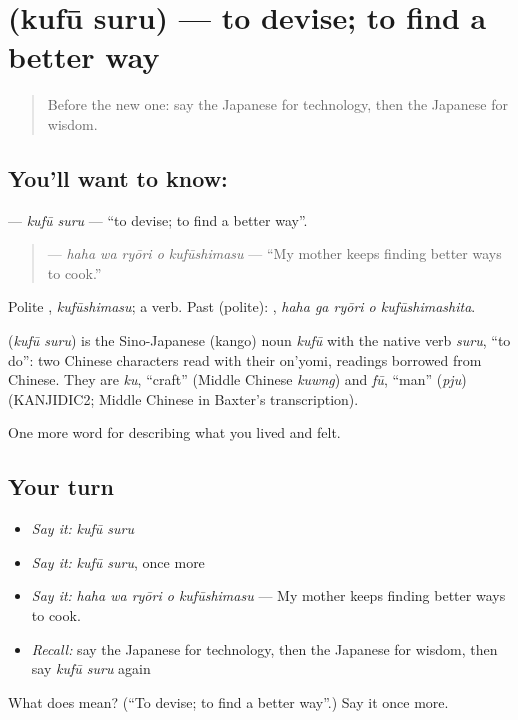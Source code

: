 \section[\texorpdfstring{\ja{くふうする} (kufū suru)}{くふうする (kufū suru)}]{ (kufū suru) — to devise; to find a better way}

\label{lesson:JA-C481-kufuu-suru}



\begin{quote}
Before the new one: say the Japanese for technology, then the Japanese for wisdom.
\end{quote}

\subsection*{You'll want to know: }
\textbf{} — \emph{kufū suru} — \textquotedblleft{}to devise; to find a better way\textquotedblright{}.

\begin{quote}
\textbf{  } — \emph{haha wa ryōri o kufūshimasu} — \textquotedblleft{}My mother keeps finding better ways to cook.\textquotedblright{}
\end{quote}

Polite \textbf{}, \emph{kufūshimasu}; a  verb. Past (polite): \textbf{  }, \emph{haha ga ryōri o kufūshimashita}.

\begin{cousinweb}
\textbf{} (\emph{kufū suru}) is the Sino-Japanese (kango) noun \emph{kufū} with the native verb \emph{suru}, \textquotedblleft{}to do\textquotedblright{}: two Chinese characters read with their on'yomi, readings borrowed from Chinese. They are \emph{ku}, \textquotedblleft{}craft\textquotedblright{} (Middle Chinese \emph{kuwng}) and \emph{fū}, \textquotedblleft{}man\textquotedblright{} (\emph{pju}) (KANJIDIC2; Middle Chinese in Baxter's transcription).
\end{cousinweb}

\begin{grammarlens}[title={What you've built}]
One more word for describing what you lived and felt.
\end{grammarlens}

\subsection*{Your turn}
\begin{itemize}
\raggedright
  \item \emph{Say it:} \emph{kufū suru}
  \item \emph{Say it:} \emph{kufū suru}, once more
  \item \emph{Say it:} \emph{haha wa ryōri o kufūshimasu} — My mother keeps finding better ways to cook.
  \item \emph{Recall:} say the Japanese for technology, then the Japanese for wisdom, then say \emph{kufū suru} again
\end{itemize}

\begin{tcolorbox}[breakable,colback=teal!4,colframe=teal!35!black,title={Before you move on}]
What does  mean? (\textquotedblleft{}To devise; to find a better way\textquotedblright{}.) Say it once more.
\end{tcolorbox}
